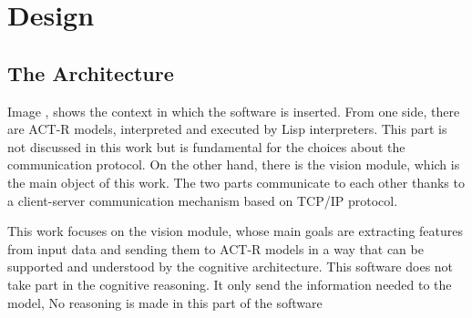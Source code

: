 \chapter{Design}\label{chDesign}
	
	\section{The Architecture}
	Image \todo{}, shows the context in which the software is inserted. 
	From one side, there are \mbox{ACT-R} models, interpreted and executed by \mbox{Lisp} interpreters. 
	This part is not discussed in this work but is fundamental for the choices about the communication protocol.
	On the other hand, there is the vision module, which is the main object of this work.
	The two parts communicate to each other thanks to a \mbox{client-server} communication mechanism based on \mbox{TCP/IP} protocol.

	This work focuses on the vision module, whose main goals are extracting features from input data and sending them to \mbox{ACT-R} models in a way that can be supported and understood by the cognitive architecture. 
	This software does not take part in the cognitive reasoning.
	It only send the information needed to the model,  
No reasoning is made in this part of the software 
